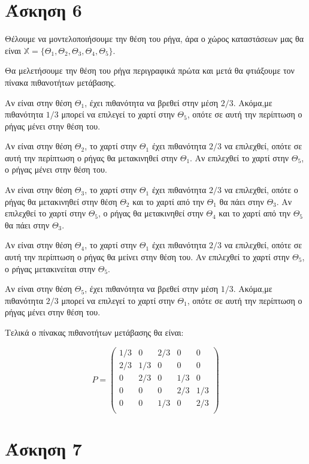 \documentclass{article}
\begin{document}
\section*{Άσκηση 6}

Θέλουμε να μοντελοποιήσουμε την θέση του ρήγα, άρα ο χώρος καταστάσεων μας θα είναι $\mathbb{X} = \{Θ_1, Θ_2, Θ_3, Θ_4, Θ_5\}$.

Θα μελετήσουμε την θέση του ρήγα περιγραφικά πρώτα και μετά θα φτιάξουμε τον πίνακα πιθανοτήτων μετάβασης.

Αν είναι στην θέση $Θ_1$, έχει πιθανότητα να βρεθεί στην μέση $2/3$. Ακόμα,με πιθανότητα $1/3$ μπορεί να επιλεγεί το χαρτί στην $Θ_5$, οπότε σε αυτή την περίπτωση ο ρήγας μένει στην θέση του.

Αν είναι στην θέση $Θ_2$, το χαρτί στην $Θ_1$ έχει πιθανότητα $2/3$ να επιλεχθεί, οπότε σε αυτή την περίπτωση ο ρήγας θα μετακινηθεί στην $Θ_1$. Αν επιλεχθεί το χαρτί στην $Θ_5$, ο ρήγας μένει στην θέση του.

Αν είναι στην θέση $Θ_3$, το χαρτί στην $Θ_1$ έχει πιθανότητα $2/3$ να επιλεχθεί, οπότε ο ρήγας θα μετακινηθεί στην θέση $Θ_2$ και το χαρτί από την $Θ_1$ θα πάει στην $Θ_3$.  Αν επιλεχθεί το χαρτί στην $Θ_5$, ο ρήγας θα μετακινηθεί στην $Θ_4$ και το χαρτί από την $Θ_5$ θα πάει στην $Θ_3$.

Αν είναι στην θέση $Θ_4$, το χαρτί στην $Θ_1$ έχει πιθανότητα $2/3$ να επιλεχθεί, οπότε σε αυτή την περίπτωση ο ρήγας θα μείνει στην θέση του. Αν επιλεχθεί το χαρτί στην $Θ_5$, ο ρήγας μετακινείται στην $Θ_5$.

Αν είναι στην θέση $Θ_5$, έχει πιθανότητα να βρεθεί στην μέση $1/3$. Ακόμα,με πιθανότητα $2/3$ μπορεί να επιλεγεί το χαρτί στην $Θ_1$, οπότε σε αυτή την περίπτωση ο ρήγας μένει στην θέση του.

Τελικά ο πίνακας πιθανοτήτων μετάβασης θα είναι:

\begin{equation*}
    P = 
    \begin{pmatrix}
        1/3 & 0 & 2/3 & 0 & 0\\
       2/3 & 1/3 & 0 & 0 & 0\\
        0 & 2/3 & 0 & 1/3 & 0\\
        0 & 0 & 0 & 2/3 & 1/3\\
        0 & 0 & 1/3 & 0 & 2/3\\
    \end{pmatrix}
\end{equation*}

\section*{Άσκηση 7}
\end{document}
